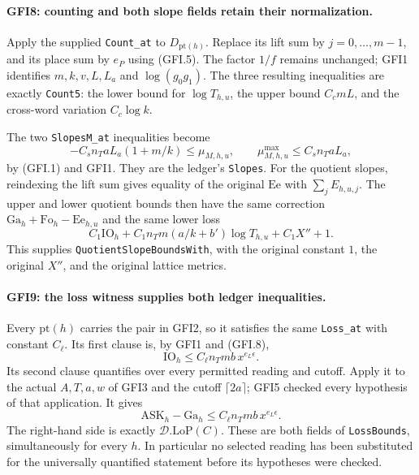 \paragraph{GFI8: counting and both slope fields retain their normalization.}
\label{claim:GFI8}
Apply the supplied \texttt{Count\_at} to $D_{\mathrm{pt}(h)}$.
Replace its lift sum by $j=0,\ldots,m-1$, and its place sum by
$e_P$ using (GFI.5).  The factor $1/f$ remains unchanged; GFI1
identifies $m,k,v,L,L_a$ and $\log(g_0g_1)$.  The three resulting
inequalities are exactly \texttt{Count5}: the lower bound for
$\log T_{h,u}$, the upper bound $C_cmL$, and the cross-word
variation $C_c\log k$.

The two \texttt{SlopesM\_at} inequalities become
\[
 -C_sn_TaL_a(1+m/k)\le\mu_{M,h,u},\qquad
 \mu^{\max}_{M,h,u}\le C_sn_TaL_a,                    \tag{GFI.17}
\]
by (GFI.1) and GFI1.  They are the ledger's \texttt{Slopes}.
For the quotient slopes, reindexing the lift sum gives equality
of the original $\mathrm{Ee}$ with $\sum_jE_{h,u,j}$.
The upper and lower quotient bounds then have the same correction
$\mathrm{Ga}_h+\mathrm{Fo}_h-\mathrm{Ee}_{h,u}$ and the same
lower loss
\[
 C_1\mathrm{IO}_h+C_1n_Tm(a/k+b')\log T_{h,u}+C_1X''+1.
                                                               \tag{GFI.18}
\]
This supplies \texttt{QuotientSlopeBoundsWith}, with the original
constant $1$, the original $X''$, and the original lattice metrics.

\paragraph{GFI9: the loss witness supplies both ledger inequalities.}
\label{claim:GFI9}
Every $\mathrm{pt}(h)$ carries the pair in GFI2, so it satisfies
the same \texttt{Loss\_at} with constant $C_\ell$.  Its first
clause is, by GFI1 and (GFI.8),
\[
 \mathrm{IO}_h\le C_\ell n_Tmb\,x^{e_L\epsilon}.
\]
Its second clause quantifies over every permitted reading and
cutoff.  Apply it to the actual $A,T,a,w$ of GFI3 and the cutoff
$\lceil2a\rceil$; GFI5 checked every hypothesis of that application.
It gives
\[
 \mathrm{ASK}_h-\mathrm{Ga}_h
                  \le C_\ell n_Tmb\,x^{e_L\epsilon}.             \tag{GFI.19}
\]
The right-hand side is exactly $\mathscr D.\mathrm{LoP}(C)$.
These are both fields of \texttt{LossBounds}, simultaneously
for every $h$.  In particular no selected reading has been substituted
for the universally quantified statement before its hypotheses were
checked.

